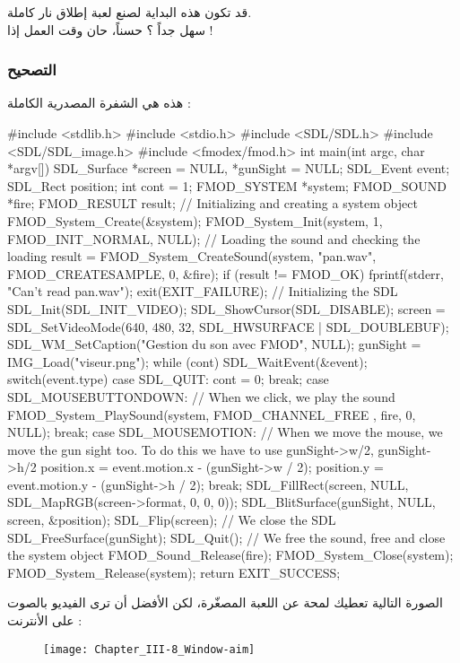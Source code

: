 قد تكون هذه البداية لصنع لعبة إطلاق نار كاملة.\\
سهل جداً ؟ حسناً، حان وقت العمل إذا !

\subsubsection{التصحيح}

هذه هي الشفرة المصدرية الكاملة :

\begin{Csource}
#include <stdlib.h>
#include <stdio.h>
#include <SDL/SDL.h>
#include <SDL/SDL_image.h>
#include <fmodex/fmod.h>
int main(int argc, char *argv[])
{
	SDL_Surface *screen = NULL, *gunSight = NULL;
	SDL_Event event;
	SDL_Rect position;
	int cont = 1;
	FMOD_SYSTEM *system;
	FMOD_SOUND *fire;
	FMOD_RESULT result;
	// Initializing and creating a system object
	FMOD_System_Create(&system);
	FMOD_System_Init(system, 1, FMOD_INIT_NORMAL, NULL);
	// Loading the sound and checking the loading
	result = FMOD_System_CreateSound(system, "pan.wav", FMOD_CREATESAMPLE, 0, &fire);
	if (result != FMOD_OK)
	{
		fprintf(stderr, "Can't read pan.wav\n");
		exit(EXIT_FAILURE);
	}
	// Initializing the SDL
	SDL_Init(SDL_INIT_VIDEO);
	SDL_ShowCursor(SDL_DISABLE);
	screen = SDL_SetVideoMode(640, 480, 32, SDL_HWSURFACE | SDL_DOUBLEBUF);
	SDL_WM_SetCaption("Gestion du son avec FMOD", NULL);
	gunSight = IMG_Load("viseur.png");
	while (cont)
	{
		SDL_WaitEvent(&event);
		switch(event.type)
		{
			case SDL_QUIT:
			cont = 0;
			break;
			case SDL_MOUSEBUTTONDOWN:
			// When we click, we play the sound
			FMOD_System_PlaySound(system, FMOD_CHANNEL_FREE , fire, 0, NULL);
			break;
			case SDL_MOUSEMOTION:
			// When we move the mouse, we move the gun sight too. To do this we have to use gunSight->w/2, gunSight->h/2
			position.x = event.motion.x - (gunSight->w / 2);
			position.y = event.motion.y - (gunSight->h / 2);
			break;
		}
		SDL_FillRect(screen, NULL, SDL_MapRGB(screen->format, 0, 0, 0));
		SDL_BlitSurface(gunSight, NULL, screen, &position);
		SDL_Flip(screen);
	}	
	// We close the SDL
	SDL_FreeSurface(gunSight);
	SDL_Quit();
	// We free the sound, free and close the system object
	FMOD_Sound_Release(fire);
	FMOD_System_Close(system);
	FMOD_System_Release(system);
	return EXIT_SUCCESS;
}
\end{Csource}

الصورة التالية تعطيك لمحة عن اللعبة المصغّرة، لكن الأفضل أن ترى الفيديو بالصوت على الأنترنت :

\begin{figure}[H]
	\centering
	\texttt{[image: Chapter\_III-8\_Window-aim]}
\end{figure}

